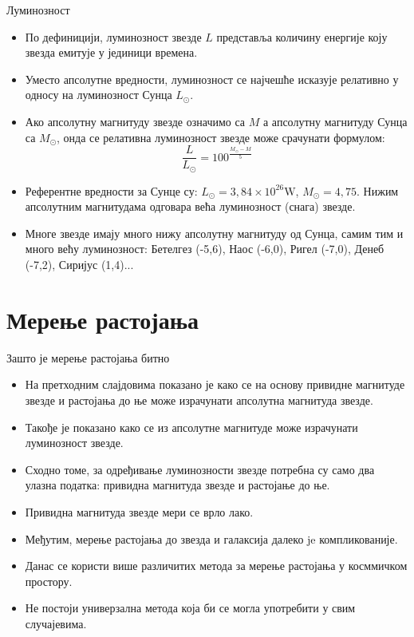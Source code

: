 \documentclass[aspectratio=169, xcolor=table, 10pt]{beamer}
\theoremstyle{definition}
\begin{document}
\begin{frame}{Луминозност}
  \begin{itemize}
    \item По дефиницији, луминозност звезде $L$ представља количину енергије коју звезда емитује у јединици времена.
    \item Уместо апсолутне вредности, луминозност се најчешће исказује релативно у односу на луминозност Сунца $L_\odot$.
    \item Ако апсолутну магнитуду звезде означимо са $M$ а апсолутну магнитуду Сунца са $M_\odot$, онда се релативна луминозност звезде може срачунати формулом:
      \begin{equation*}
        \frac{L}{L_\odot} = 100^\frac{M_\odot-M}{5}
      \end{equation*}
    \item Референтне вредности за Сунце су: $L_\odot=3,84\times 10^{26}\text{W}$, $M_\odot=4,75$. Нижим апсолутним магнитудама одговара већа луминозност (снага) звезде.
    \item Многе звезде имају много нижу апсолутну магнитуду од Сунца, самим тим и много већу луминозност: Бетелгез (-5,6), Наос (-6,0), Ригел (-7,0), Денеб (-7,2), Сиријус (1,4)...
  \end{itemize}
\end{frame}

\section{Мерење растојања}

\begin{frame}{Зашто је мерење растојања битно}
  \begin{itemize}
    \item На претходним слајдовима показано је како се на основу привидне магнитуде звезде и растојања до ње може израчунати апсолутна магнитуда звезде.
    \item Такође је показано како се из апсолутне магнитуде може израчунати луминозност звезде.
    \item Сходно томе, за одређивање луминозности звезде потребна су само два улазна податка: привидна магнитуда звезде и растојање до ње.
    \item Привидна магнитуда звезде мери се врло лако.
    \item Међутим, мерење растојања до звезда и галаксија далеко je компликованије.
    \item Данас се користи више различитих метода за мерење растојања у косммичком простору.
    \item Не постоји универзална метода која би се могла употребити у свим случајевима.
  \end{itemize}
\end{frame}
\end{document}
